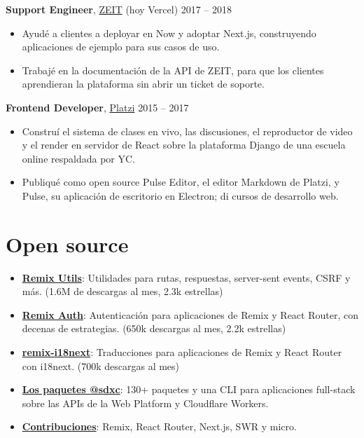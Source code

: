 \documentclass[10pt,letterpaper]{article}
\begin{document}
\textbf{Support Engineer}, \href{https://vercel.com}{ZEIT} {\color{muted}(hoy Vercel)} \hfill {\color{muted}2017 – 2018}
\begin{itemize}
\item Ayudé a clientes a deployar en Now y adoptar Next.js, construyendo aplicaciones de ejemplo para sus casos de uso.
\item Trabajé en la documentación de la API de ZEIT, para que los clientes aprendieran la plataforma sin abrir un ticket de soporte.
\end{itemize}

\textbf{Frontend Developer}, \href{https://platzi.com}{Platzi} \hfill {\color{muted}2015 – 2017}
\begin{itemize}
\item Construí el sistema de clases en vivo, las discusiones, el reproductor de video y el render en servidor de React sobre la plataforma Django de una escuela online respaldada por YC.
\item Publiqué como open source Pulse Editor, el editor Markdown de Platzi, y Pulse, su aplicación de escritorio en Electron; di cursos de desarrollo web.
\end{itemize}

\section*{Open source}
\begin{itemize}
\item \textbf{\href{https://github.com/sergiodxa/remix-utils}{Remix Utils}}: Utilidades para rutas, respuestas, server-sent events, CSRF y más. {\color{muted}(1.6M de descargas al mes, 2.3k estrellas)}
\item \textbf{\href{https://github.com/sergiodxa/remix-auth}{Remix Auth}}: Autenticación para aplicaciones de Remix y React Router, con decenas de estrategias. {\color{muted}(650k descargas al mes, 2.2k estrellas)}
\item \textbf{\href{https://github.com/sergiodxa/remix-i18next}{remix-i18next}}: Traducciones para aplicaciones de Remix y React Router con i18next. {\color{muted}(700k descargas al mes)}
\item \textbf{\href{https://sdxc.dev}{Los paquetes @sdxc}}: 130+ paquetes y una CLI para aplicaciones full-stack sobre las APIs de la Web Platform y Cloudflare Workers.
\item \textbf{\href{https://github.com/sergiodxa}{Contribuciones}}: Remix, React Router, Next.js, SWR y micro.
\end{itemize}
\end{document}
